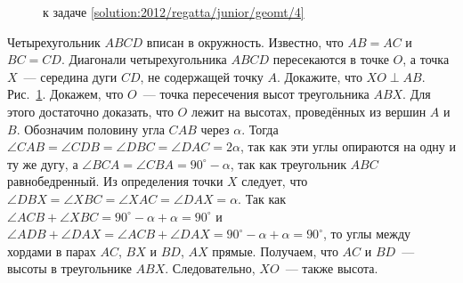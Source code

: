 \ifsolution
\begin{figure}\centering
    \caption{к задаче \ref{solution:2012/regatta/junior/geomt/4}}
    \label{fig:solution:2012/regatta/junior/geomt/4}
\end{figure}
\fi %

\problem
Четырехугольник $ABCD$ вписан в окружность.
Известно, что $AB = AC$ и $BC = CD$.
Диагонали четырехугольника $ABCD$ пересекаются в точке $O$, а точка $X$~---
середина дуги $CD$, не содержащей точку $A$. Докажите, что $XO \perp AB$.
\solution
\label{solution:2012/regatta/junior/geomt/4}%
Рис.~\ref{fig:solution:2012/regatta/junior/geomt/4}.
Докажем, что $O$~--- точка пересечения высот треугольника $ABX$.
Для этого достаточно доказать, что $O$ лежит на высотах, проведённых из вершин
$A$ и $B$.
Обозначим половину угла $CAB$ через $\alpha$.
Тогда
$\angle CAB = \angle CDB = \angle DBC = \angle DAC = 2 \alpha$,
так как эти углы опираются на одну и ту же дугу, а
$\angle BCA = \angle CBA = 90^\circ - \alpha$,
так как треугольник $ABC$ равнобедренный.
Из определения точки $X$ следует, что
$\angle DBX = \angle XBC = \angle XAC = \angle DAX = \alpha$.
Так как
\(
    \angle ACB + \angle XBC
=
    90^\circ - \alpha + \alpha
=
    90^\circ
\)
и
\(
    \angle ADB + \angle DAX
=
    \angle ACB + \angle DAX
=
    90^\circ - \alpha + \alpha
=
    90^\circ
\),
то углы между хордами в парах $AC$, $BX$ и $BD$, $AX$ прямые.
Получаем, что $AC$ и $BD$~--- высоты в треугольнике $ABX$.
Следовательно, $XO$~--- также высота.
\endproblem
